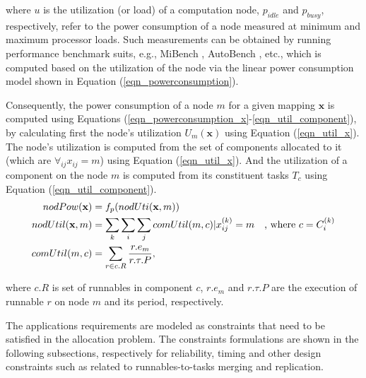 where $u$ is the utilization (or load) of a computation node, $p_{idle}$ and $p_{busy}$, respectively, refer to the power consumption of a node measured at minimum and maximum processor loads. Such measurements can be obtained by running performance benchmark suits, e.g., MiBench \cite{Guthaus2001MiBench:Suite}, AutoBench \cite{EMBC2018AutoBenchProcessors}, etc., which is computed based on the utilization of the node via the linear power consumption model shown in Equation (\ref{eqn_powerconsumption}).

Consequently, the power consumption of a node $m$ for a given mapping $\textbf{x}$ is computed using Equations (\ref{eqn_powerconsumption_x}-\ref{eqn_util_component}), by calculating first the node's utilization $U_m(\textbf{x})$ using Equation (\ref{eqn_util_x}). The node's utilization is computed from the set of components allocated to it (which are $\forall_{ij} x_{ij}=m$) using Equation (\ref{eqn_util_x}). And the utilization of a component on the node $m$ is computed from its constituent tasks $T_c$ using Equation (\ref{eqn_util_component}).
\begin{align}
	\label{eqn_powerconsumption_x}
nodPow(\textbf{x}) & =f_p(nodUti(\textbf{x},m))                         &  \\
	\label{eqn_util_x}
nodUtil(\textbf{x},m)           & = \sum_{k}{\sum_{i}{\sum_{j}{comUtil(m,c)}}}|\xkij=m         & \text{, where } c=\sss{C}\\
	\label{eqn_util_component}
comUtil(m,c)              & = \sum_{r\in c.R} \frac{r.e_m}{r.\tau.P}, &
\end{align}

where $c.R$ is set of runnables in component $c$, $r.e_m$ and $r.\tau.P$ are the execution of runnable $r$ on node $m$ and its period, respectively.

The applications requirements are modeled as constraints that need to be satisfied in the allocation problem. The constraints formulations are shown in the following subsections, respectively for reliability, timing and other design constraints such as related to runnables-to-tasks merging and replication.

